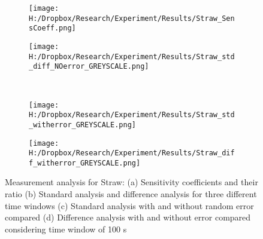 \documentclass[12pt]{report}
\begin{document}
\begin{figure}
\begin{subfigure}{.5\textwidth}
\centering
\texttt{[image: H:/Dropbox/Research/Experiment/Results/Straw\_SensCoeff.png]}
\caption{}
\end{subfigure}\hfill
\begin{subfigure}{.5\textwidth}
\centering
\texttt{[image: H:/Dropbox/Research/Experiment/Results/Straw\_std\_diff\_NOerror\_GREYSCALE.png]}
\caption{}
\end{subfigure}\\
\begin{subfigure}{.5\textwidth}
\centering
\texttt{[image: H:/Dropbox/Research/Experiment/Results/Straw\_std\_witherror\_GREYSCALE.png]}
\caption{}
\end{subfigure}\hfill
\begin{subfigure}{.5\textwidth}
\centering
\texttt{[image: H:/Dropbox/Research/Experiment/Results/Straw\_diff\_witherror\_GREYSCALE.png]}
\caption{}
\end{subfigure}
\caption{Measurement analysis for Straw: (a) Sensitivity coefficients and their ratio (b) Standard analysis and difference analysis for three different time windows (c) Standard analysis with and without random error compared (d) Difference analysis with and without error compared considering time window of 100 s}

\end{figure}
\end{document}
